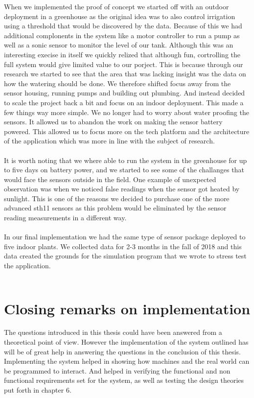 \documentclass[]{uiophd}
\begin{document}
When we implemented the proof of concept we started off with an outdoor deployment in a greenhouse as the original idea was to also control irrigation using a threshold that would be discovered by the data. Because of this we had additional complonents in the system like a motor controller to run a pump as well as a sonic sensor to monitor the level of our tank. Although this was an interesting execise in itself we quickly relized that although fun, cortrolling the full system would give limited value to our porject. This is because through our research we started to see that the area that was lacking insight was the data on how the watering should be done. We therefore shifted focus away from the sensor housing, running pumps and building out plumbing. And instead decided to scale the project back a bit and focus on an indoor deployment. This made a few things way more simple. We no longer had to worry about water proofing the sensors. It allowed us to abandon the work on making the sensor battery powered. This allowed us to focus more on the tech platform and the architecture of the application which was more in line with the subject of research. 
\\\\
It is worth noting that we where able to run the system in the greenhouse for up to five days on battery power, and we started to see some of the challanges that would face the sensors outside in the field. One example of unexpected observation was when we noticed false readings when the sensor got heated by sunlight. This is one of the reasons we decided to purchase one of the more advanced sth11 sensors as this problem would be eliminated by the sensor reading measurements in a different way.
\\\\
In our final implementation we had the same type of sensor package deployed to five indoor plants. We collected data for 2-3 months in the fall of 2018 and this data created the grounds for the simulation program that we wrote to stress test the application.
\\\\
\section{Closing remarks on implementation}
The questions introduced in this thesis could have been answered from a theoretical point of view. However the implementation of the system outlined has will be of great help in answering the questions in the conclusion of this thesis. Implementing the system helped in showing how machines and the real world can be programmed to interact. And helped in verifying the functional and non functional requirements set for the system, as well as testing the design theories put forth in chapter 6.
\end{document}
